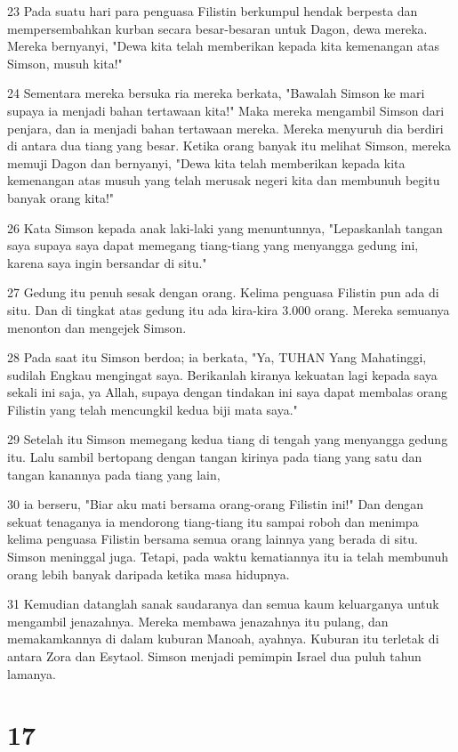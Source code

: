\par 23 Pada suatu hari para penguasa Filistin berkumpul hendak berpesta dan mempersembahkan kurban secara besar-besaran untuk Dagon, dewa mereka. Mereka bernyanyi, "Dewa kita telah memberikan kepada kita kemenangan atas Simson, musuh kita!"
\par 24 Sementara mereka bersuka ria mereka berkata, "Bawalah Simson ke mari supaya ia menjadi bahan tertawaan kita!" Maka mereka mengambil Simson dari penjara, dan ia menjadi bahan tertawaan mereka. Mereka menyuruh dia berdiri di antara dua tiang yang besar. Ketika orang banyak itu melihat Simson, mereka memuji Dagon dan bernyanyi, "Dewa kita telah memberikan kepada kita kemenangan atas musuh yang telah merusak negeri kita dan membunuh begitu banyak orang kita!"
\par 26 Kata Simson kepada anak laki-laki yang menuntunnya, "Lepaskanlah tangan saya supaya saya dapat memegang tiang-tiang yang menyangga gedung ini, karena saya ingin bersandar di situ."
\par 27 Gedung itu penuh sesak dengan orang. Kelima penguasa Filistin pun ada di situ. Dan di tingkat atas gedung itu ada kira-kira 3.000 orang. Mereka semuanya menonton dan mengejek Simson.
\par 28 Pada saat itu Simson berdoa; ia berkata, "Ya, TUHAN Yang Mahatinggi, sudilah Engkau mengingat saya. Berikanlah kiranya kekuatan lagi kepada saya sekali ini saja, ya Allah, supaya dengan tindakan ini saya dapat membalas orang Filistin yang telah mencungkil kedua biji mata saya."
\par 29 Setelah itu Simson memegang kedua tiang di tengah yang menyangga gedung itu. Lalu sambil bertopang dengan tangan kirinya pada tiang yang satu dan tangan kanannya pada tiang yang lain,
\par 30 ia berseru, "Biar aku mati bersama orang-orang Filistin ini!" Dan dengan sekuat tenaganya ia mendorong tiang-tiang itu sampai roboh dan menimpa kelima penguasa Filistin bersama semua orang lainnya yang berada di situ. Simson meninggal juga. Tetapi, pada waktu kematiannya itu ia telah membunuh orang lebih banyak daripada ketika masa hidupnya.
\par 31 Kemudian datanglah sanak saudaranya dan semua kaum keluarganya untuk mengambil jenazahnya. Mereka membawa jenazahnya itu pulang, dan memakamkannya di dalam kuburan Manoah, ayahnya. Kuburan itu terletak di antara Zora dan Esytaol. Simson menjadi pemimpin Israel dua puluh tahun lamanya.

\chapter{17}

